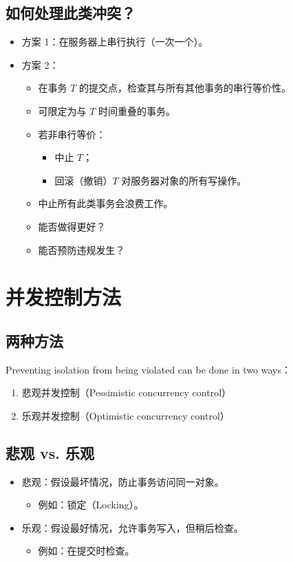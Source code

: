 \subsection{如何处理此类冲突？}

\begin{itemize}
  \item 方案 1：在服务器上串行执行（一次一个）。
  \item 方案 2：
  \begin{itemize}
    \item 在事务 $T$ 的提交点，检查其与所有其他事务的串行等价性。
    \item 可限定为与 $T$ 时间重叠的事务。
    \item 若非串行等价：
    \begin{itemize}
      \item 中止 $T$；
      \item 回滚（撤销）$T$ 对服务器对象的所有写操作。
    \end{itemize}
    \item 中止所有此类事务会浪费工作。
    \item 能否做得更好？
    \item 能否预防违规发生？
  \end{itemize}
\end{itemize}

\section{并发控制方法}

\subsection{两种方法}

Preventing isolation from being violated can be done in two ways：

\begin{enumerate}
  \item 悲观并发控制（Pessimistic concurrency control）
  \item 乐观并发控制（Optimistic concurrency control）
\end{enumerate}

\subsection{悲观 vs. 乐观}

\begin{itemize}
  \item 悲观：假设最坏情况，防止事务访问同一对象。
  \begin{itemize}
    \item 例如：锁定（Locking）。
  \end{itemize}
  \item 乐观：假设最好情况，允许事务写入，但稍后检查。
  \begin{itemize}
    \item 例如：在提交时检查。
  \end{itemize}
\end{itemize}

